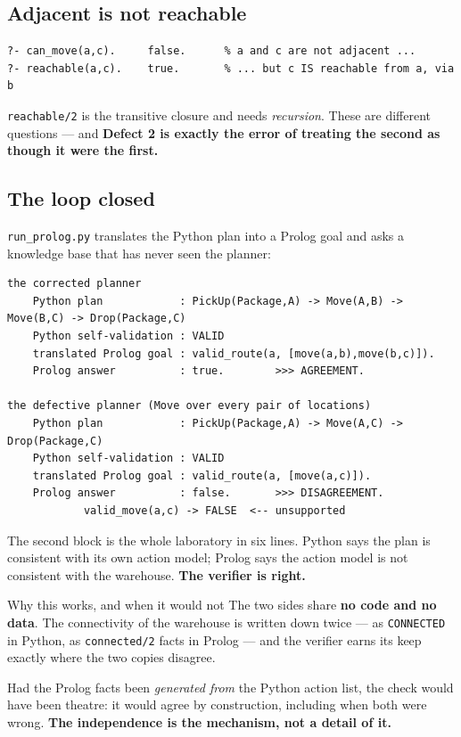 \documentclass[11pt,a4paper]{article}
\begin{document}
\subsection{Adjacent is not reachable}

\begin{lstlisting}
?- can_move(a,c).     false.      % a and c are not adjacent ...
?- reachable(a,c).    true.       % ... but c IS reachable from a, via b
\end{lstlisting}

\texttt{reachable/2} is the transitive closure and needs \emph{recursion}. These
are different questions --- and \textbf{Defect 2 is exactly the error of
treating the second as though it were the first.}

\subsection{The loop closed}

\texttt{run\_prolog.py} translates the Python plan into a Prolog goal and asks a
knowledge base that has never seen the planner:

\begin{lstlisting}
the corrected planner
    Python plan            : PickUp(Package,A) -> Move(A,B) -> Move(B,C) -> Drop(Package,C)
    Python self-validation : VALID
    translated Prolog goal : valid_route(a, [move(a,b),move(b,c)]).
    Prolog answer          : true.        >>> AGREEMENT.

the defective planner (Move over every pair of locations)
    Python plan            : PickUp(Package,A) -> Move(A,C) -> Drop(Package,C)
    Python self-validation : VALID
    translated Prolog goal : valid_route(a, [move(a,c)]).
    Prolog answer          : false.       >>> DISAGREEMENT.
            valid_move(a,c) -> FALSE  <-- unsupported
\end{lstlisting}

The second block is the whole laboratory in six lines. Python says the plan is
consistent with its own action model; Prolog says the action model is not
consistent with the warehouse. \textbf{The verifier is right.}

\begin{okbox}{Why this works, and when it would not}
The two sides share \textbf{no code and no data}. The connectivity of the
warehouse is written down twice --- as \texttt{CONNECTED} in Python, as
\texttt{connected/2} facts in Prolog --- and the verifier earns its keep exactly
where the two copies disagree.

Had the Prolog facts been \emph{generated from} the Python action list, the
check would have been theatre: it would agree by construction, including when
both were wrong. \textbf{The independence is the mechanism, not a detail of it.}
\end{okbox}
\end{document}

